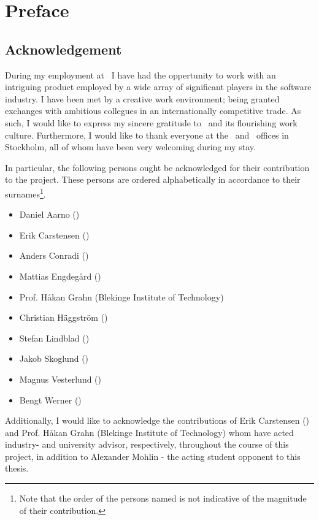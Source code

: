 
\chapter*{Preface}
\label{cha:preface}

\section*{Acknowledgement}
\label{sec:preface_acknowledgement}
During my employment at \dvttermintel\ I have had the oppertunity to work with an intriguing product employed by a wide array of significant players in the software industry.
I have been met by a creative work environment; being granted exchanges with ambitious collegues in an internationally competitive trade.
As such, I would like to express my sincere gratitude to \dvttermintel\ and its flourishing work culture.
Furthermore, I would like to thank everyone at the \dvttermintel\ and \dvttermwindriver\ offices in Stockholm, all of whom have been very welcoming during my stay.

In particular, the following persons ought be acknowledged for their contribution to the project.
These persons are ordered alphabetically in accordance to their surnames\footnote{Note that the order of the persons named is not indicative of the magnitude of their contribution.}.

\begin{itemize}[noitemsep]
	\item Daniel Aarno (\dvttermintel )
	\item Erik Carstensen (\dvttermintel )
	\item Anders Conradi (\dvttermintel )
	\item Mattias Engdegård (\dvttermintel )
	\item Prof. Håkan Grahn (Blekinge Institute of Technology)
	\item Christian Häggström (\dvttermintel )
	\item Stefan Lindblad (\dvttermintel )
	\item Jakob Skoglund (\dvttermwindriver )
	\item Magnus Vesterlund (\dvttermwindriver )
	\item Bengt Werner (\dvttermintel )
\end{itemize}

Additionally, I would like to acknowledge the contributions of Erik Carstensen (\dvttermintel ) and Prof. Håkan Grahn (Blekinge Institute of Technology) whom have acted industry- and university advisor, respectively, throughout the course of this project, in addition to Alexander Mohlin - the acting student opponent to this thesis.

